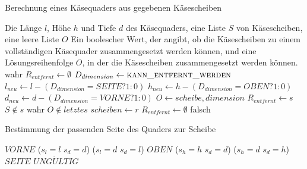 \documentclass[a4paper,10pt,ngerman]{scrartcl}
\begin{document}
    \begin{algorithm}[H]
        \caption{Berechnung eines Käsequaders aus gegebenen Käsescheiben}
        \begin{algorithmic}
            \Require Die Länge $l$, Höhe $h$ und Tiefe $d$ des Käsequaders, eine Liste $S$ von Käsescheiben, eine leere Liste $O$
            \Ensure Ein boolescher Wert, der angibt, ob die Käsescheiben zu einem vollständigen Käsequader zusammengesetzt werden können,
            und eine Lösungsreihenfolge $O$, in der die Käsescheiben zusammengesetzt werden können.
                    \State \Return wahr
                \EndIf
                \State $R_{entfernt} \gets \emptyset$
                    \State $D_{dimension} \gets \textsc{kann\_entfernt\_werden}$
                        \State $l_{neu} \gets l - (D_{dimension} = SEITE ? 1 : 0)$
                        \State $h_{neu}  \gets h - (D_{dimension} = OBEN ? 1 : 0)$
                        \State $d_{neu}  \gets d - (D_{dimension} = VORNE ? 1 : 0)$
                        \State $O \gets {scheibe, dimension}$
                        \State $R_{entfernt} \gets s$
                        \State $S \notin s$
                    \EndIf
                        \State \Return wahr
                    \Else
                        \State $O \notin letztes$
                            \State $scheiben \gets r$
                        \EndFor
                        \State $R_{entfernt} \gets \emptyset$
                        \EndElse
                    \EndIf
                \EndFor
                \State \Return falsch
            \EndFunction
        \end{algorithmic}\label{alg:pseudo_greedy}
    \end{algorithm}


    \begin{algorithm}[H]
        \caption{Bestimmung der passenden Seite des Quaders zur Scheibe}
        \label{alg:cheese2}
        \begin{algorithmic}
                    \State \Return $VORNE$
                \ElsIf
                        {($s_{l} = l$ \land $s_{d} = d$) \lor ($s_{l} = d$ \land $s_{d} = l$)}
                    \State \Return $OBEN$
                \ElsIf
                        {($s_{h} = h$ \land $s_{d} = d$) \lor ($s_{h} = d$ \land $s_{d} = h$)}
                    \State \Return $SEITE$
                \Else
                    \State \Return $UNG\ddot ULTIG$
                \EndIf
            \EndFunction
        \end{algorithmic}
    \end{algorithm}
\end{document}
